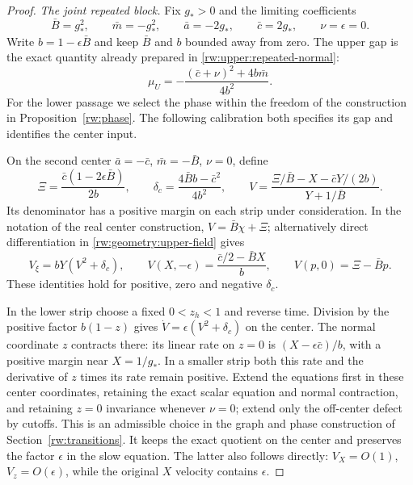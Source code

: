 \begin{proof}
\leavevmode\par\smallskip\noindent\textit{The joint repeated block.}
Fix $g_*>0$ and the limiting coefficients
\[
 \bar B=g_*^2,\qquad \bar m=-g_*^2,\qquad
 \bar a=-2g_*,\qquad \bar c=2g_*,\qquad \nu=\epsilon=0.
\]
Write $b=1-\epsilon\bar B$ and keep $\bar B$ and $b$ bounded away
from zero. The upper gap is the exact quantity already prepared in
\eqref{rw:upper:repeated-normal}:
\begin{equation}\label{rw:coordinates:upper-gap}
 \mu_U=-\frac{(\bar c+\nu)^2+4b\bar m}{4b^2}.
\end{equation}
For the lower passage we select the phase within the freedom of the
construction in Proposition~\ref{rw:phase}. The following calibration
both specifies its gap and identifies the center input.

On the second center $\bar a=-\bar c$, $\bar m=-\bar B$, $\nu=0$,
define
\begin{equation}\label{rw:coordinates:center-quotient}
 \Xi=\frac{\bar c(1-2\epsilon\bar B)}{2b},\qquad
 \delta_c=\frac{4\bar Bb-\bar c^2}{4b^2},\qquad
 V=\frac{\Xi/\bar B-X-\bar cY/(2b)}{Y+1/\bar B}.
\end{equation}
Its denominator has a positive margin on each strip under
consideration. In the notation of the real center construction,
$V=\bar B\chi+\Xi$; alternatively direct differentiation in
\eqref{rw:geometry:upper-field} gives
\begin{equation}\label{rw:coordinates:center-scalar}
 V_\xi=bY(V^2+\delta_c),\qquad
 V(X,-\epsilon)=\frac{\bar c/2-\bar BX}{b},\qquad
 V(p,0)=\Xi-\bar Bp.
\end{equation}
These identities hold for positive, zero and negative $\delta_c$.

In the lower strip choose a fixed $0<z_h<1$ and reverse time.
Division by the positive factor $b(1-z)$ gives
$\dot V=\epsilon(V^2+\delta_c)$ on the center.
The normal coordinate $z$ contracts there: its linear rate on $z=0$
is $(X-\epsilon\bar c)/b$, with a positive margin near
$X=1/g_*$. In a smaller strip both this rate and the derivative
of $z$ times its rate remain positive. Extend the equations first
in these center coordinates, retaining the exact scalar equation and
normal contraction, and retaining $z=0$ invariance whenever $\nu=0$;
extend only the off-center defect by cutoffs.
This is an admissible choice in the graph and phase construction of
Section~\ref{rw:transitions}. It keeps the exact quotient on the
center and preserves the factor $\epsilon$ in the slow equation.
The latter also follows directly: $V_X=O(1)$, $V_z=O(\epsilon)$,
while the original $X$ velocity contains $\epsilon$.


\end{proof}
